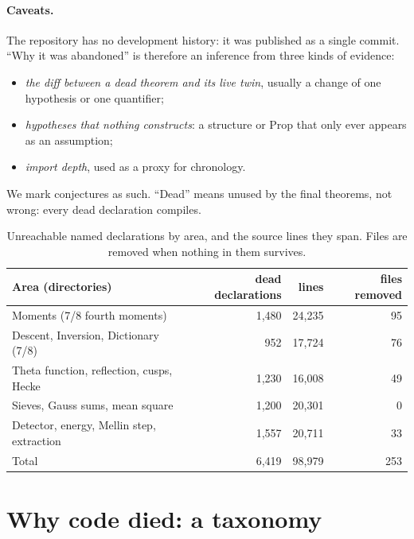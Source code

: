 \documentclass[11pt,a4paper]{article}
\begin{document}
\paragraph{Caveats.} The repository has no development history: it was published as a single
commit. ``Why it was abandoned'' is therefore an inference from three kinds of evidence:
\begin{itemize}
\item \emph{the diff between a dead theorem and its live twin}, usually a change of one hypothesis
or one quantifier;
\item \emph{hypotheses that nothing constructs}: a structure or Prop that only ever appears as an
assumption;
\item \emph{import depth}, used as a proxy for chronology.
\end{itemize}
We mark conjectures as such. ``Dead'' means unused by the final theorems, not wrong: every dead
declaration compiles.

\begin{table}[h]
\centering\small
\begin{tabular}{@{}lrrr@{}}
\toprule
Area (directories) & dead declarations & lines & files removed \\
\midrule
Moments (7/8 fourth moments) & 1,480 & 24,235 & 95 \\
Descent, Inversion, Dictionary (7/8) & 952 & 17,724 & 76 \\
Theta function, reflection, cusps, Hecke & 1,230 & 16,008 & 49 \\
Sieves, Gauss sums, mean square & 1,200 & 20,301 & 0 \\
Detector, energy, Mellin step, extraction & 1,557 & 20,711 & 33 \\
\midrule
Total & 6,419 & 98,979 & 253 \\
\bottomrule
\end{tabular}
\caption{Unreachable named declarations by area, and the source lines they span. Files are removed
when nothing in them survives.}\label{tab:areas}
\end{table}

\section{Why code died: a taxonomy}
\end{document}
